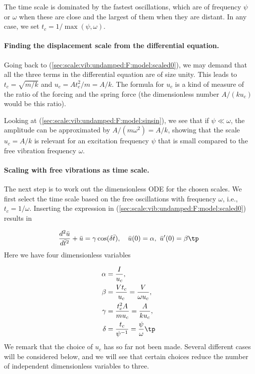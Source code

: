 \documentclass[graybox,envcountchap,sectrefs,final]{svmonodo}
\begin{document}
The time scale is dominated by the fastest oscillations, which are
of frequency $\psi$ or $\omega$ when these are close and the largest
of them when they are distant. In any case, we set
$t_c=1/\max(\psi,\omega)$.

\paragraph{Finding the displacement scale from the differential equation.}
Going back to (\ref{sec:scale:vib:undamped:F:model:scaled0}), we
may demand that all the three terms in the differential equation
are of size unity. This leads to $t_c=\sqrt{m/k}$
and $u_c=At_c^2/m = A/k$. The formula for $u_c$ is a kind of measure
of the ratio of the
forcing and the spring force (the dimensionless number
$A/(ku_c)$ would be this ratio).

Looking at (\ref{sec:scale:vib:undamped:F:model:sinsin}), we see
that if $\psi\ll\omega$, the amplitude can be approximated
by $A/(m\omega^2)=A/k$, showing that the scale $u_c=A/k$ is
relevant for an excitation frequency $\psi$ that is small compared to
the free vibration frequency $\omega$.

\paragraph{Scaling with free vibrations as time scale.}
The next step is to work out the dimensionless ODE for the chosen scales.
We first select the time scale based on the free oscillations
with frequency $\omega$, i.e., $t_c=1/\omega$. Inserting the expression in
(\ref{sec:scale:vib:undamped:F:model:scaled0}) results in

\begin{equation}
\frac{d^2\bar u}{d\bar t^2} + \bar u =
\gamma
\cos(\delta\bar t),
\quad \bar u(0)=\alpha,\ \bar u'(0)=\beta\tp
\label{sec:scale:vib:undamped:F:model:scaled2}
\end{equation}
Here we have four dimensionless variables

\begin{align}
\alpha &= \frac{I}{u_c},\\ 
\beta  &= \frac{Vt_c}{u_c} = \frac{V}{\omega u_c},\\ 
\gamma &= \frac{t_c^2 A}{mu_c} = \frac{A}{ku_c},\\ 
\delta &= \frac{t_c}{\psi^{-1}} = \frac{\psi}{\omega}\tp
\end{align}
We remark that the choice of $u_c$ has so far not been made. Several
different cases will be considered below, and we will see that certain
choices reduce the number of independent dimensionless variables to
three.
\end{document}
